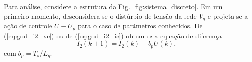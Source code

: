   \vspace{\fill}
  \noindent
  \begin{minipage}{\textwidth}
    \makebox[\textwidth]{
      \centering
      \def\svgwidth{\textwidth}
      }
    \label{fig:phase_g_go_delta_vc}
  \end{minipage}
  \vspace{\fill}

  \newpage

  \vspace{0.5cm}
  \noindent
  \begin{minipage}{\textwidth}
    \makebox[\textwidth]{
      \centering
      \def\svgwidth{\textwidth}
      }
    \label{fig:pzmap_delta_vc}
  \end{minipage}
  \vspace{1cm}


  Para análise, considere a estrutura da Fig.~\ref{fig:sistema_discreto}. Em um primeiro momento, desconsidera-se o distúrbio de tensão da rede $V_g$ e projeta-se a ação de controle $U \equiv U_p$ para o caso de parâmetros conhecidos. %
  De (\ref{eq:god_i2_vc}) ou de (\ref{eq:god_i2_ic}) obtem-se a equação de diferença
  \begin{equation}
    I_2 (k + 1) = I_2 (k) + b_p U (k) \text{,}
    \label{eq:diferenca}
  \end{equation}
  com $b_p = T_s / L_g$.

